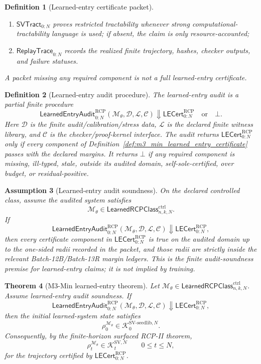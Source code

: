\documentclass[11pt]{article}
\newtheorem{theorem}{Theorem}[section]
\newtheorem{definition}[theorem]{Definition}
\newtheorem{assumption}[theorem]{Assumption}
\newcommand{\1}{\mathbf{1}}
\newcommand{\RCP}{\mathrm{RCP}}
\providecommand{\Kcal}{\mathcal{K}}
\begin{document}
\begin{definition}[Learned-entry certificate packet]
\begin{enumerate}[label=(\roman*),leftmargin=1.5em]
    \item \(\mathsf{SVTract}_{0:N}\) proves restricted tractability whenever strong computational-tractability language is used; if absent, the claim is only resource-accounted;
    \item \(\mathsf{ReplayTrace}_{0:N}\) records the realized finite trajectory, hashes, checker outputs, and failure statuses.
\end{enumerate}
A packet missing any required component is not a full learned-entry certificate.
\end{definition}

\begin{definition}[Learned-entry audit procedure]
\label{def:m3_min_learned_entry_audit}
The learned-entry audit is a partial finite procedure
\[
\mathsf{LearnedEntryAudit}_{0:N}^{\RCP}
(\mathcal M_\theta,\mathcal D,\mathcal L,\mathcal C)
\Downarrow
\mathsf{LECert}_{0:N}^{\RCP}\quad\text{or}\quad\bot.
\]
Here \(\mathcal D\) is the finite audit/calibration/stress data, \(\mathcal L\) is the declared finite witness library, and \(\mathcal C\) is the checker/proof-kernel interface.  The audit returns \(\mathsf{LECert}_{0:N}^{\RCP}\) only if every component of Definition~\ref{def:m3_min_learned_entry_certificate} passes with the declared margins.  It returns \(\bot\) if any required component is missing, ill-typed, stale, outside its audited domain, self-sole-certified, over budget, or residual-positive.
\end{definition}

\begin{assumption}[Learned-entry audit soundness]
\label{ass:m3_min_learned_entry_audit_soundness}
On the declared controlled class, assume the audited system satisfies
\[
\mathcal M_\theta\in\mathsf{LearnedRCPClass}_{n,k,N}^{\mathrm{ctrl}}.
\]
If
\[
\mathsf{LearnedEntryAudit}_{0:N}^{\RCP}
(\mathcal M_\theta,\mathcal D,\mathcal L,\mathcal C)
\Downarrow
\mathsf{LECert}_{0:N}^{\RCP},
\]
then every certificate component in \(\mathsf{LECert}_{0:N}^{\RCP}\) is true on the audited domain up to the one-sided radii recorded in the packet, and those radii are strictly inside the relevant Batch-12B/Batch-13R margin ledgers.  This is the finite audit-soundness premise for learned-entry claims; it is not implied by training.
\end{assumption}

\begin{theorem}[M3-Min learned-entry theorem]
\label{thm:m3_min_learned_entry}
Let \(\mathcal M_\theta\in\mathsf{LearnedRCPClass}_{n,k,N}^{\mathrm{ctrl}}\).  Assume learned-entry audit soundness.  If
\[
\mathsf{LearnedEntryAudit}_{0:N}^{\RCP}
(\mathcal M_\theta,\mathcal D,\mathcal L,\mathcal C)
\Downarrow
\mathsf{LECert}_{0:N}^{\RCP},
\]
then the initial learned-system state satisfies
\[
\rho_0^{\mathcal M_\theta}
\in
\Kcal_0^{\mathrm{SV\mbox{-}seedlib},N}.
\]
Consequently, by the finite-horizon surfaced RCP-II theorem,
\[
\rho_t^{\mathcal M_\theta}
\in
\Kcal_t^{\mathrm{SV},N}
\qquad
0\le t\le N,
\]
for the trajectory certified by \(\mathsf{LECert}_{0:N}^{\RCP}\).
\end{theorem}
\end{document}
